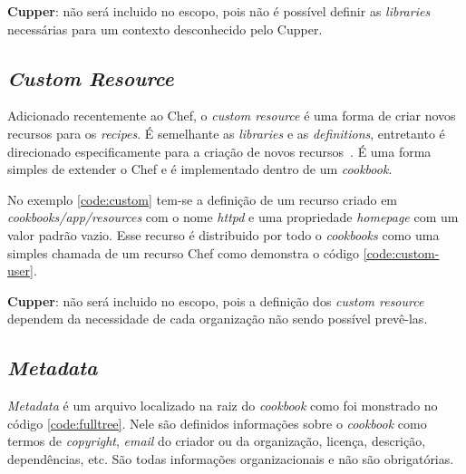 \textbf{Cupper}: não será incluido no escopo, pois não é possível definir as \textit{libraries}
necessárias para um contexto desconhecido pelo Cupper.

\subsection{\textit{Custom Resource}}
\label{sec:lev-rec-cust}

Adicionado recentemente ao Chef, o \textit{custom resource} é uma forma de criar
novos recursos para os \textit{recipes}. É semelhante as \textit{libraries} e as \textit{definitions},
entretanto é direcionado especificamente para a criação de novos recursos~\cite{chefdoc:2016}.
É uma forma simples de extender o Chef e é implementado dentro de um
\textit{cookbook}.

No exemplo \ref{code:custom} tem-se a definição de um recurso criado em \textit{cookbooks/app/resources}
com o nome \textit{httpd} e uma propriedade \textit{homepage} com um valor padrão vazio.
Esse recurso é distribuido por todo o \textit{cookbooks} como uma simples chamada
de um recurso Chef como demonstra o código \ref{code:custom-user}.

\noindent\begin{minipage}{.45\textwidth}
  \lstset{style=shell}
  
\end{minipage}\hfill
\begin{minipage}{.45\textwidth}
  \lstset{style=shell}
  
\end{minipage}

\textbf{Cupper}: não será incluido no escopo, pois a definição dos \textit{custom resource} dependem
da necessidade de cada organização não sendo possível prevê-las.

\subsection{\textit{Metadata}}
\label{sec:cbmetadata}

\textit{Metadata} é um arquivo localizado na raiz do \textit{cookbook} como foi monstrado no código
\ref{code:fulltree}. Nele são definidos informações sobre o \textit{cookbook} como termos de \textit{copyright},
\textit{email} do criador ou da organização, licença, descrição, dependências, etc. São 
todas informações organizacionais e não são obrigatórias.

